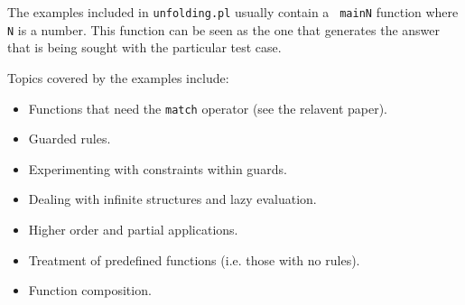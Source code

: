 \documentclass[11pt,a4paper,twoside,openright]{book}
\begin{document}
\noindent
The examples included in {\tt unfolding.pl} usually contain a {\tt
  mainN} function where {\tt N} is a number. This function can be seen
as the one that generates the answer that is being sought with the
particular test case.

Topics covered by the examples include:

\begin{itemize}
\item
Functions that need the {\tt match} operator (see the relavent paper).

\item
Guarded rules.

\item
Experimenting with constraints within guards.

\item
Dealing with infinite structures and lazy evaluation.

\item
Higher order and partial applications.

\item
Treatment of predefined functions (i.e. those with no rules).

\item
Function composition.

\end{itemize}
\end{document}
